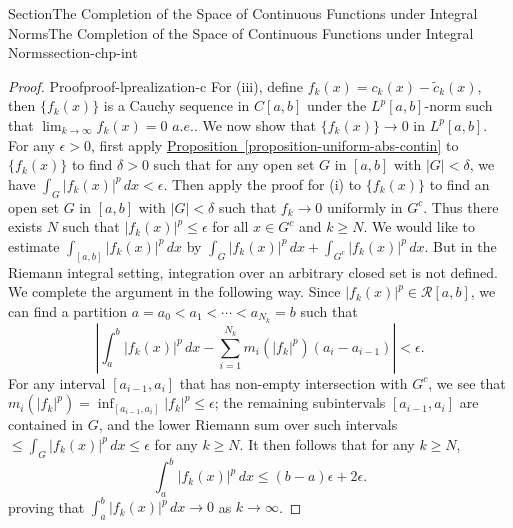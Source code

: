 \documentclass[oneside,10pt,]{article}
\newcommand{\xreffont}{\relax}
\numberwithin{equation}{section}
\begin{document}
\begin{sectionptx}{Section}{The Completion of the Space of Continuous Functions under Integral Norms}{}{The Completion of the Space of Continuous Functions under Integral Norms}{}{}{section-chp-int}
\begin{proof}{Proof}{}{proof-lprealization-c}
For (iii), define \(f_{k}(x)=c_{k}(x)-\tilde c_{k}(x)\), then \(\{f_{k}(x)\}\) is a Cauchy sequence  in \(C[a, b]\) under the \(L^{p}[a,  b]\)-norm such that \(\lim_{k\to\infty} f_{k}(x)=0\) \(a.e.\). We now show that \(\{f_{k}(x)\}\to 0\) in \(L^{p}[a, b]\). For any \(\epsilon > 0\), first apply \hyperref[proposition-uniform-abs-contin]{Proposition~{\xreffont\ref{proposition-uniform-abs-contin}}} to \(\{f_{k}(x)\}\) to find \(\delta > 0\) such that for any open set \(G\) in \([a, b]\) with \(|G| < \delta\), we have \(\int_{G} |f_{k}(x)|^{p}\, dx < \epsilon\). Then apply the proof for (i) to \(\{f_{k}(x)\}\) to find an open set \(G\) in \([a, b]\) with \(|G| < \delta\) such that \(f_{k} \to 0\) uniformly in \(G^{c}\). Thus there exists \(N\) such that \(|f_{k}(x)|^{p} \le \epsilon \) for all \(x\in G^{c}\) and \(k\ge N\). We would like to estimate \(\int_{[a, b]} |f_{k}(x)|^{p}\, dx\) by \(\int_{G} |f_{k}(x)|^{p}\, dx + \int_{G^{c}} |f_{k}(x)|^{p}\, dx\). But in the Riemann integral setting, integration over an arbitrary closed set is not defined.  We complete the argument in the following way. Since \(|f_{k}(x)|^{p} \in \mathcal R[a, b]\), we can find a partition \(a=a_{0} < a_{1} < \cdots < a_{N_{k}}=b\) such that%
\begin{equation*}
\left| \int_{a}^{b} |f_{k}(x)|^{p}\, dx -\sum_{i=1}^{N_{k}} m_{i}(|f_{k}|^{p})(a_{i}-a_{i-1})\right| < \epsilon.
\end{equation*}
For any interval \([a_{i-1}, a_{i}]\) that has non-empty intersection with \(G^{c}\), we see that \(m_{i}(|f_{k}|^{p})=\inf_{[a_{i-1}, a_{i}]}|f_{k}|^{p} \le \epsilon\); the remaining subintervals \([a_{i-1}, a_{i}]\) are contained in \(G\), and the lower Riemann sum over such intervals \(\le \int_{G} |f_{k}(x)|^{p}\, dx \le \epsilon\) for any \(k\ge N\). It then follows that for any \(k\ge N\),%
\begin{equation*}
\int_{a}^{b} |f_{k}(x)|^{p}\, dx\le (b-a)\epsilon + 2\epsilon.
\end{equation*}
proving that \(\int_{a}^{b} |f_{k}(x)|^{p}\, dx\to 0\) as \(k\to \infty\).%
\end{proof}
%
\end{sectionptx}
\end{document}
